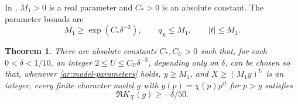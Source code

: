 \documentclass[twoside]{aomart}
\theoremstyle{paperplain}
\newtheorem{theorem}{Theorem}[section]
\theoremstyle{paperdefinition}
\numberwithin{equation}{section}
\begin{document}
In , $M_1>0$ is a real parameter and
$C_*>0$ is an absolute constant. The parameter bounds are
\begin{equation}
 M_1\ge\exp(C_*\delta^{-3}),\qquad
 q_\chi\le M_1,\qquad |t|\le M_1.
 \label{ar:model-parameters}
\end{equation}

\begin{theorem}
\label{ar:model-positivity}
There are absolute constants $C_*,C_U>0$ such that, for each
$0<\delta<1/10$, an integer $2\le U\le C_U\delta^{-3}$,
depending only on $\delta$, can be chosen so that, whenever
\eqref{ar:model-parameters} holds, $y\ge M_1$, and
$X\ge(M_1y)^U$ is an integer, every finite character model $g$
with $g(p)=\chi(p)p^{it}$ for $p>y$ satisfies
\begin{equation}
 \Re K_X(g)\ge-\delta/50.
 \label{ar:model-positivity-bound}
\end{equation}
\end{theorem}
\end{document}
